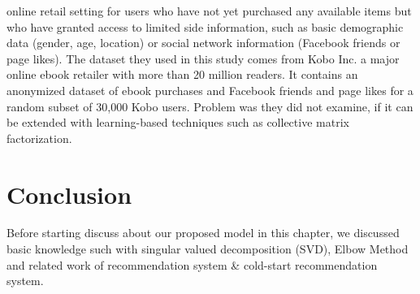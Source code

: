 \documentclass[document.tex]{subfiles}
\begin{document}
online retail setting for users who have not yet purchased any available items but who have granted access to limited side information, such as basic demographic data (gender, age, location) or social network information (Facebook friends or page likes). The dataset they used in this study comes from Kobo Inc. a major online ebook retailer with more than 20 million readers. It contains an anonymized dataset of ebook purchases and Facebook friends and page likes for a random subset of 30,000 Kobo users. Problem was they did not examine, if it can be extended with learning-based techniques such as collective matrix factorization.

\section{Conclusion}
Before starting discuss about our proposed model in this chapter, we discussed basic knowledge such with singular valued decomposition (SVD), Elbow Method and related work of recommendation system \& cold-start recommendation system.
\end{document}
